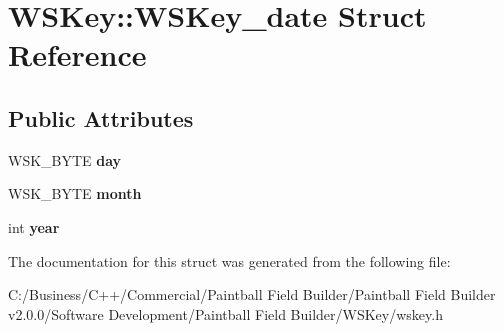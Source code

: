 \hypertarget{struct_w_s_key_1_1_w_s_key__date}{
\section{WSKey::WSKey\_\-date Struct Reference}
\label{struct_w_s_key_1_1_w_s_key__date}
}
\subsection*{Public Attributes}
\begin{DoxyCompactItemize}
\item 
\hypertarget{struct_w_s_key_1_1_w_s_key__date_a04ff3afaf6c54d9f5539729b429a5de9}{
WSK\_\-BYTE {\bfseries day}}
\label{struct_w_s_key_1_1_w_s_key__date_a04ff3afaf6c54d9f5539729b429a5de9}

\item 
\hypertarget{struct_w_s_key_1_1_w_s_key__date_ad836f17ae0d3cdac58764e97aae5eb49}{
WSK\_\-BYTE {\bfseries month}}
\label{struct_w_s_key_1_1_w_s_key__date_ad836f17ae0d3cdac58764e97aae5eb49}

\item 
\hypertarget{struct_w_s_key_1_1_w_s_key__date_ad91444c60ab6612b579d1628bc2f4343}{
int {\bfseries year}}
\label{struct_w_s_key_1_1_w_s_key__date_ad91444c60ab6612b579d1628bc2f4343}

\end{DoxyCompactItemize}


The documentation for this struct was generated from the following file:\begin{DoxyCompactItemize}
\item 
C:/Business/C++/Commercial/Paintball Field Builder/Paintball Field Builder v2.0.0/Software Development/Paintball Field Builder/WSKey/wskey.h\end{DoxyCompactItemize}
